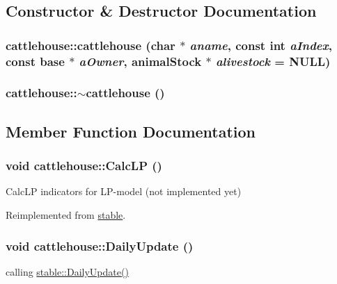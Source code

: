 \subsection{Constructor \& Destructor Documentation}
\hypertarget{classcattlehouse_afdd153b139a38dfbac4dfdb3fd558e73}{
\subsubsection[{cattlehouse}]{\setlength{\rightskip}{0pt plus 5cm}cattlehouse::cattlehouse (char $\ast$ {\em aname}, \/  const int {\em aIndex}, \/  const {\bf base} $\ast$ {\em aOwner}, \/  {\bf animalStock} $\ast$ {\em alivestock} = {\ttfamily NULL})}}
\label{classcattlehouse_afdd153b139a38dfbac4dfdb3fd558e73}
\hypertarget{classcattlehouse_aae784075e2e6f6518603cb85d0440d6a}{
\subsubsection[{$\sim$cattlehouse}]{\setlength{\rightskip}{0pt plus 5cm}cattlehouse::$\sim$cattlehouse ()}}
\label{classcattlehouse_aae784075e2e6f6518603cb85d0440d6a}


\subsection{Member Function Documentation}
\hypertarget{classcattlehouse_a7806fd8778ff33751dcb81e06a01471e}{
\subsubsection[{CalcLP}]{\setlength{\rightskip}{0pt plus 5cm}void cattlehouse::CalcLP ()}}
\label{classcattlehouse_a7806fd8778ff33751dcb81e06a01471e}
CalcLP indicators for LP-\/model (not implemented yet) 

Reimplemented from \hyperlink{classstable_acaf566bef659f0a671e27afa6244df4b}{stable}.\hypertarget{classcattlehouse_a75cd328a6b1b07b2eb49be0048ac889d}{
\subsubsection[{DailyUpdate}]{\setlength{\rightskip}{0pt plus 5cm}void cattlehouse::DailyUpdate ()}}
\label{classcattlehouse_a75cd328a6b1b07b2eb49be0048ac889d}
calling \hyperlink{classstable_a8bdbc59976ddb6c324e7b629794ff388}{stable::DailyUpdate()} 

